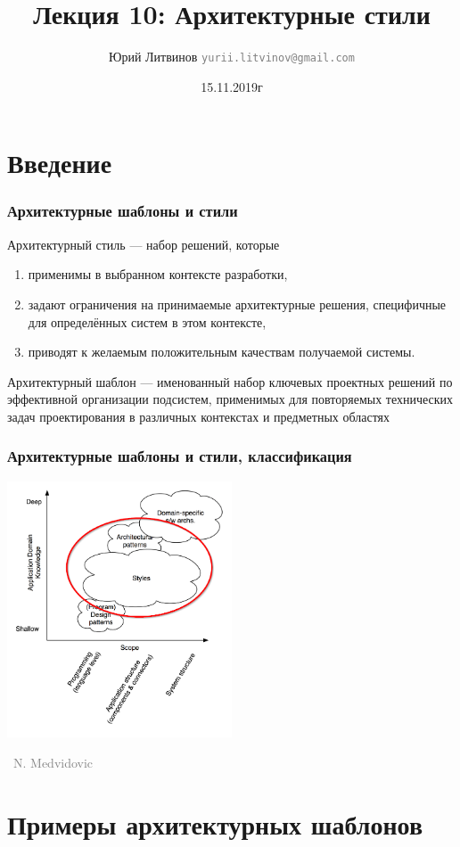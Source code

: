 \documentclass[xetex,mathserif,serif]{beamer}
\title{Лекция 10: Архитектурные стили}
\author[Юрий Литвинов]{Юрий Литвинов \newline \textcolor{gray}{\small\texttt{yurii.litvinov@gmail.com}}}
\date{15.11.2019г}
\newcommand{\attribution}[1] {
	\vspace{-5mm}\begin{flushright}\begin{scriptsize}\textcolor{gray}{\textcopyright\, #1}\end{scriptsize}\end{flushright}
}
\begin{document}
	
	\frame{\titlepage}

	\section{Введение}

	\begin{frame}
		\frametitle{Архитектурные шаблоны и стили}
		Архитектурный стиль --- набор решений, которые
		\begin{enumerate}
			\item применимы в выбранном контексте разработки,
			\item задают ограничения на принимаемые архитектурные решения, специфичные для определённых систем в этом контексте,
			\item приводят к желаемым положительным качествам получаемой системы.
		\end{enumerate}
		Архитектурный шаблон --- именованный набор ключевых проектных решений по эффективной организации подсистем, применимых для повторяемых технических задач проектирования в различных контекстах и предметных областях
	\end{frame}

	\begin{frame}
		\frametitle{Архитектурные шаблоны и стили, классификация}
		\begin{center}
			\includegraphics[width=0.5\textwidth]{architecturalStylesHighlighted.png}
			\attribution{N. Medvidovic}
		\end{center}
	\end{frame}

	\section{Примеры архитектурных шаблонов}
\end{document}
